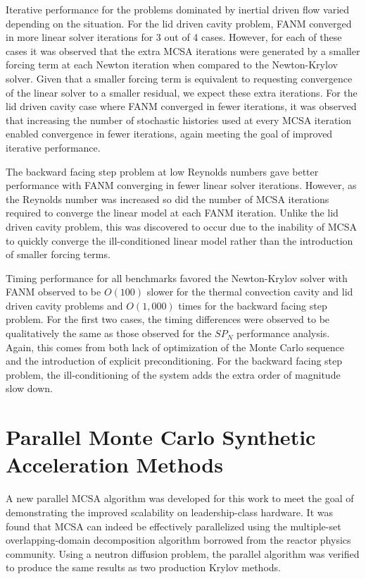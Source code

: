 Iterative performance for the problems dominated by inertial driven
flow varied depending on the situation. For the lid driven cavity
problem, FANM converged in more linear solver iterations for 3 out of
4 cases. However, for each of these cases it was observed that the
extra MCSA iterations were generated by a smaller forcing term at each
Newton iteration when compared to the Newton-Krylov solver. Given that
a smaller forcing term is equivalent to requesting convergence of the
linear solver to a smaller residual, we expect these extra
iterations. For the lid driven cavity case where FANM converged in
fewer iterations, it was observed that increasing the number of
stochastic histories used at every MCSA iteration enabled convergence
in fewer iterations, again meeting the goal of improved iterative
performance.

The backward facing step problem at low Reynolds numbers gave better
performance with FANM converging in fewer linear solver
iterations. However, as the Reynolds number was increased so did the
number of MCSA iterations required to converge the linear model at
each FANM iteration. Unlike the lid driven cavity problem, this was
discovered to occur due to the inability of MCSA to quickly converge
the ill-conditioned linear model rather than the introduction of
smaller forcing terms.

Timing performance for all benchmarks favored the Newton-Krylov solver
with FANM observed to be $O(100)$ slower for the thermal convection
cavity and lid driven cavity problems and $O(1,000)$ times for the
backward facing step problem. For the first two cases, the timing
differences were observed to be qualitatively the same as those
observed for the $SP_N$ performance analysis. Again, this comes from
both lack of optimization of the Monte Carlo sequence and the
introduction of explicit preconditioning. For the backward facing step
problem, the ill-conditioning of the system adds the extra order of
magnitude slow down.

\section{Parallel Monte Carlo Synthetic Acceleration Methods\ }
\label{sec:parallel_mc_conclusions}
A new parallel MCSA algorithm was developed for this work to meet the
goal of demonstrating the improved scalability on leadership-class
hardware. It was found that MCSA can indeed be effectively parallelized
using the multiple-set overlapping-domain decomposition algorithm
borrowed from the reactor physics community. Using a neutron diffusion
problem, the parallel algorithm was verified to produce the same
results as two production Krylov methods.

